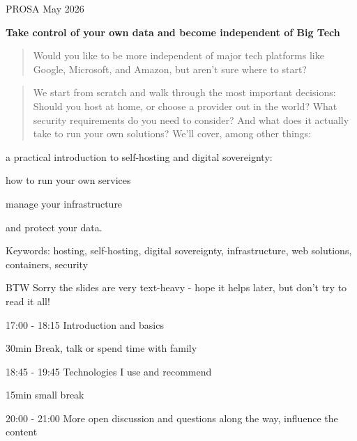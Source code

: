 \documentclass[Screen16to9,17pt]{foils}
\begin{document}
{PROSA May 2026}


\hlkprofiluk




{\bf \large Take control of your own data and become independent of Big Tech}


\begin{quote}\large
Would you like to be more independent of major tech platforms like Google, Microsoft, and Amazon, but aren't sure where to start?
\end{quote}


\begin{quote}
We start from scratch and walk through the most important decisions: Should you host at home, or choose a provider out in the world? What security requirements do you need to consider? And what does it actually take to run your own solutions?
We'll cover, among other things:
\end{quote}


\begin{list2}
\item a practical introduction to self-hosting and digital sovereignty:
\item how to run your own services
\item manage your infrastructure
\item and protect your data.
\end{list2}

Keywords: hosting, self-hosting, digital sovereignty, infrastructure, web solutions, containers, security

BTW Sorry the slides are very text-heavy - hope it helps later, but don't try to read it all!





\begin{list2}
\item 17:00 - 18:15 Introduction and basics
\item 30min Break, talk or spend time with family
\item 18:45 - 19:45 Technologies I use and recommend
\item 15min small break
\item 20:00 - 21:00 More open discussion and questions along the way, influence the content
\end{list2}
\end{document}
